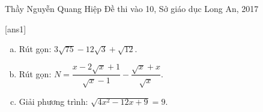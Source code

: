 \begin{name}
{Thầy Nguyễn Quang Hiệp}
{Đề thi vào 10, Sở giáo dục Long An, 2017}
\end{name}
\setcounter{ex}{0}
[ans1]

\begin{ex}%
\hfill
	\begin{enumerate}[a)]
		\item Rút gọn: $3\sqrt{75}-12\sqrt{3}+\sqrt{12}$.
		\item Rút gọn: $N=\dfrac{x-2\sqrt{x}+1}{\sqrt{x}-1}-\dfrac{\sqrt{x}+x}{\sqrt{x}}$.
		\item Giải phương trình: $\sqrt{4x^2-12x+9}=9$.
	\end{enumerate}
\end{ex}

